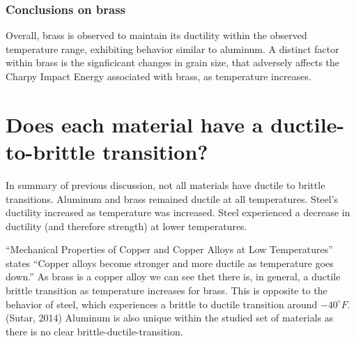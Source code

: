 \documentclass{article}
\begin{document}
\subsubsection*{Conclusions on brass}

Overall, brass is observed to maintain its ductility within the observed temperature range, exhibiting behavior similar to aluminum. A distinct factor within brass is the signficicant changes in grain size, that adversely affects the Charpy Impact Energy associated with brass, as temperature increases.


\section{Does each material have a ductile-to-brittle transition?}
In summary of previous discussion, not all materials have ductile to brittle transitions. Aluminum and brass remained ductile at all temperatures. Steel's ductility increased as temperature was increased. Steel experienced a decrease in ductility (and therefore strength) at lower temperatures.


“Mechanical Properties of Copper and Copper Alloys at Low Temperatures” states ``Copper alloys become stronger and more ductile as temperature goes down.'' As brass is a copper alloy we can see thet there is, in general, a ductile brittle transition as temperature increases for brass. This is opposite to the behavior of steel, which experiences a brittle to ductile transition around $-40^\circ F$. (Sutar, 2014) Aluminum is also unique within the studied set of materials as there is no clear brittle-ductile-transition.
\end{document}
